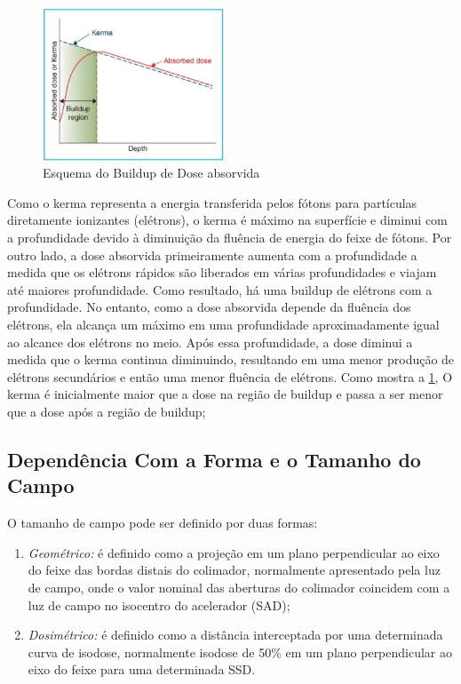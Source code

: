 \documentclass[11pt,a4paper]{article}
\begin{document}
		\begin{figure}
			\centering
			\includegraphics[width=0.48\textwidth]{Imagens/esquemaBuildup.JPG}
			\caption{Esquema do Buildup de Dose absorvida}
			\label{fig:esquemaBuildup}
		\end{figure}

	Como o kerma representa a energia transferida pelos fótons para partículas diretamente ionizantes (elétrons), o kerma é máximo na superfície e diminui com a profundidade devido à diminuição da fluência de energia do feixe de fótons. Por outro lado, a dose absorvida primeiramente aumenta com a profundidade a medida que os elétrons rápidos são liberados em várias profundidades e viajam até maiores profundidade. Como resultado, há uma buildup de elétrons com a profundidade. No entanto, como a dose absorvida depende da fluência dos elétrons, ela alcança um máximo em uma profundidade aproximadamente igual ao alcance dos elétrons no meio. Após essa profundidade, a dose diminui a medida que o kerma continua diminuindo, resultando em uma menor produção de elétrons secundários e então uma menor fluência de elétrons. Como mostra a \ref{fig:esquemaBuildup}, O kerma é inicialmente maior que a dose na região de buildup e passa a ser menor que a dose após a região de buildup; 

	
	\subsection{Dependência Com a Forma e o Tamanho do Campo}

	O tamanho de campo pode ser definido por duas formas:

	\begin{enumerate}
		\item \textit{\textcolor{CarnationPink}{Geométrico:}} é definido como a projeção em um plano perpendicular ao eixo do feixe das bordas distais do colimador, normalmente apresentado pela luz de campo, onde o valor nominal das aberturas do colimador coincidem com a luz de campo no isocentro do acelerador (SAD);
		\item \textit{\textcolor{CarnationPink}{Dosimétrico:}} é definido como a distância interceptada por uma determinada curva de isodose, normalmente isodose de 50\% em um plano perpendicular ao eixo do feixe para uma determinada SSD. 
	\end{enumerate}
\end{document}
